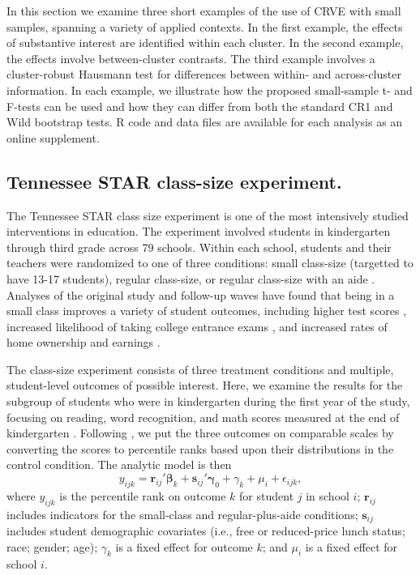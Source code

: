 \documentclass[12pt]{article}\usepackage[]{graphicx}\usepackage[]{color}
\newcommand{\bm}{\mathbf}
\newcommand{\bs}{\boldsymbol}
\begin{document}
In this section we examine three short examples of the use of CRVE with small samples, spanning a variety of applied contexts. 
In the first example, the effects of substantive interest are identified within each cluster. 
In the second example, the effects involve between-cluster contrasts. 
The third example involves a cluster-robust Hausmann test for differences between within- and across-cluster information. 
In each example, we illustrate how the proposed small-sample t- and F-tests can be used and how they can differ from both the standard CR1 and Wild bootstrap tests. 
R code and data files are available for each analysis as an online supplement.

\subsection{Tennessee STAR class-size experiment.} 

The Tennessee STAR class size experiment is one of the most intensively studied interventions in education.  The experiment involved students in kindergarten through third grade across 79 schools. Within each school, students and their teachers were randomized to one of three conditions: small class-size (targetted to have 13-17 students), regular class-size, or regular class-size with an aide \citep[for a more detailed review, see][]{Schanzenbach2006what}. Analyses of the original study and follow-up waves have found that being in a small class improves a variety of student outcomes, including higher test scores \citep{Schanzenbach2006what}, increased likelihood of taking college entrance exams \citep{Krueger2001effect}, and increased rates of home ownership and earnings \citep{Chetty2011how}. 

The class-size experiment consists of three treatment conditions and multiple, student-level outcomes of possible interest. Here, we examine the results for the subgroup of students who were in kindergarten during the first year of the study, focusing on reading, word recognition, and math scores measured at the end of kindergarten \citep{Achilles2008tennessee}. Following \citet{Krueger2001effect}, we put the three outcomes on comparable scales by converting the scores to percentile ranks based upon their distributions in the control condition. The analytic model is then
\begin{equation}
y_{ijk} = \bm{r}_{ij}'\bs\beta_k + \bm{s}_{ij}'\bs\gamma_0 + \gamma_k + \mu_i + \epsilon_{ijk}, 
\end{equation}
where $y_{ijk}$ is the percentile rank on outcome $k$ for student $j$ in school $i$; $\bm{r}_{ij}$ includes indicators for the small-class and regular-plus-aide conditions; $\bm{s}_{ij}$ includes student demographic covariates (i.e., free or reduced-price lunch status; race; gender; age); $\gamma_k$ is a fixed effect for outcome $k$; and $\mu_i$ is a fixed effect for school $i$. 
\end{document}
